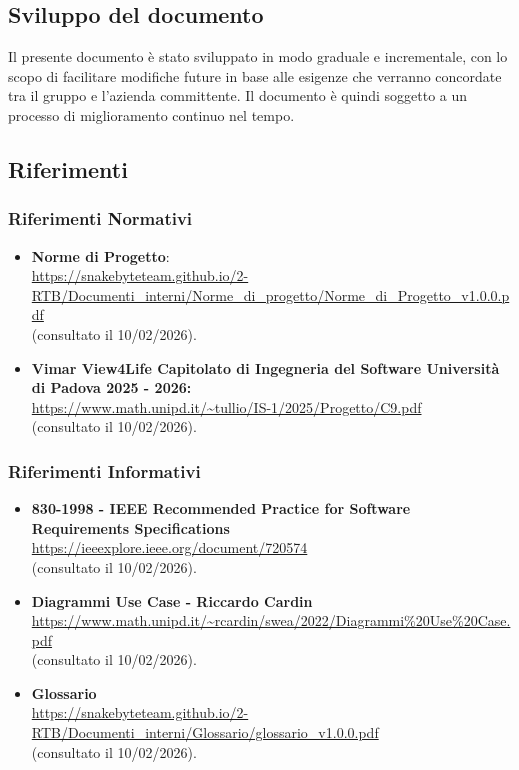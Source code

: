 \documentclass[10pt, letterpaper]{article}
\begin{document}
\subsection{Sviluppo del documento}{
    Il presente documento è stato sviluppato in modo graduale e incrementale, con lo scopo di facilitare modifiche future in base alle esigenze che verranno concordate tra il gruppo e l'azienda committente. Il documento è quindi soggetto a un processo di miglioramento continuo nel tempo.
}

\subsection{Riferimenti}

\subsubsection{Riferimenti Normativi}
\begin{itemize}
    \item \textbf{Norme di Progetto}:
          \\ \url{https://snakebyteteam.github.io/2-RTB/Documenti_interni/Norme_di_progetto/Norme_di_Progetto_v1.0.0.pdf}
          \\(consultato il 10/02/2026).

    \item \textbf{Vimar View4Life Capitolato di Ingegneria del Software Università di Padova 2025 - 2026:}
          \\ \url{https://www.math.unipd.it/~tullio/IS-1/2025/Progetto/C9.pdf}
          \\ (consultato il 10/02/2026).
\end{itemize}

\subsubsection{Riferimenti Informativi}
\begin{itemize}
    \item \textbf{830-1998 - IEEE Recommended Practice for Software Requirements Specifications}
          \\ \url{https://ieeexplore.ieee.org/document/720574}
          \\ (consultato il 10/02/2026).

    \item \textbf{Diagrammi Use Case - Riccardo Cardin}
          \\ \url{https://www.math.unipd.it/~rcardin/swea/2022/Diagrammi%20Use%20Case.pdf} 
          \\ (consultato il 10/02/2026).
    \item \textbf{Glossario}
          \\ \url{https://snakebyteteam.github.io/2-RTB/Documenti_interni/Glossario/glossario_v1.0.0.pdf}
          \\ (consultato il 10/02/2026).
\end{itemize}
\end{document}
